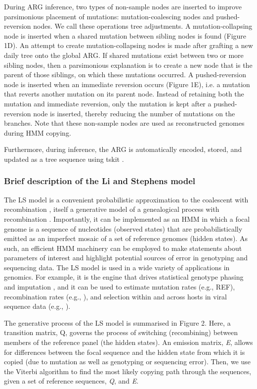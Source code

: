 \documentclass{article}
\begin{document}
During ARG inference, two types of non-sample nodes are inserted to improve parsimonious placement of mutations: mutation-coalescing nodes and pushed-reversion nodes. We call these operations tree adjustments. A mutation-collapsing node is inserted when a shared mutation between sibling nodes is found (Figure 1D). An attempt to create mutation-collapsing nodes is made after grafting a new daily tree onto the global ARG. If shared mutations exist between two or more sibling nodes, then a parsimonious explanation is to create a new node that is the parent of those siblings, on which these mutations occurred. A pushed-reversion node is inserted when an immediate reversion occurs (Figure 1E), i.e. a mutation that reverts another mutation on its parent node. Instead of retaining both the mutation and immediate reversion, only the mutation is kept after a pushed-reversion node is inserted, thereby reducing the number of mutations on the branches. Note that these non-sample nodes are used as reconstructed genomes during HMM copying.

Furthermore, during inference, the ARG is automatically encoded, stored, and updated as a tree sequence using tskit \cite{Kelleher2018-xc}.

\subsubsection{Brief description of the Li and Stephens model}

The LS model is a convenient probabilistic approximation to the coalescent with recombination \cite{Hudson1983-if}, itself a generative model of a genealogical process with recombination \cite{Li2003-ib}. Importantly, it can be implemented as an HMM in which a focal genome is a sequence of nucleotides (observed states) that are probabilistically emitted as an imperfect mosaic of a set of reference genomes (hidden states). As such, an efficient HMM machinery can be employed to make statements about parameters of interest and highlight potential sources of error in genotyping and sequencing data. The LS model is used in a wide variety of applications in genomics. For example, it is the engine that drives statistical genotype phasing and imputation \cite{Delaneau2019-wl,Browning2021-cg,Browning2018-nk,Rubinacci2020-pa}, and it can be used to estimate mutation rates (e.g., REF), recombination rates (e.g., \cite{Hinch2011-tz}), and selection within and across hosts in viral sequence data (e.g., \cite{Palmer2019-wa}).

The generative process of the LS model is summarised in Figure 2. Here, a transition matrix, Q, governs the process of switching (recombining) between members of the reference panel (the hidden states). An emission matrix, \textit{E}, allows for differences between the focal sequence and the hidden state from which it is copied (due to mutation as well as genotyping or sequencing error). Then, we use the Viterbi algorithm \cite{Viterbi1967-ol} to find the most likely copying path through the sequences, given a set of reference sequences, \textit{Q}, and \textit{E}.
\end{document}
